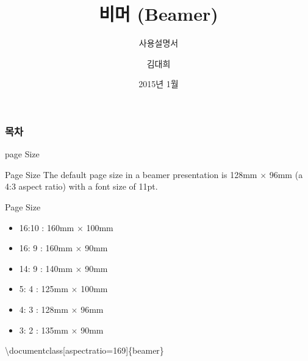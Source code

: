 \documentclass[10pt,blue,xcolor=pdftex,dvipsnames,table,handout]{beamer}
\begin{document}
	

			\title{비머 (Beamer)}
			\subtitle{사용설명서}
			\author{김대희}
			\date[2011.11.10]{2015년 1월}



		\begin{frame}[plain]
		\titlepage
		\note[item]{}
		\end{frame}



		\begin{frame}[plain]
		\frametitle{목차}

		\tableofcontents


		\end{frame}



		\begin{frame}[t]{page Size}

			\begin{block} {Page Size}
			The default page size 
			in a beamer presentation is 128mm $\times$ 96mm (a 4:3 aspect ratio) 
			with a font size of 11pt.
			\end{block}


			\begin{block}{Page Size}
			\begin{itemize}
			\item 16:10 : 160mm $\times$ 100mm
			\item 16: 9 : 160mm $\times$ 90mm
			\item 14: 9 : 140mm $\times$ 90mm
			\item  5: 4 : 125mm $\times$ 100mm
			\item  4: 3 : 128mm $\times$ 96mm
			\item  3: 2 : 135mm $\times$ 90mm
			\end{itemize}
			\end{block}


		

			\textbackslash documentclass[aspectratio=169]\{beamer\}



		\end{frame}
\end{document}
